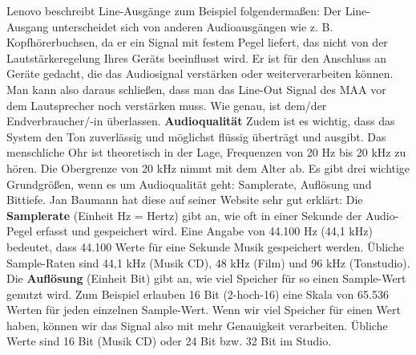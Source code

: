 \documentclass[11pt, twoside]{article}
\begin{document}
Lenovo beschreibt Line-Ausgänge zum Beispiel folgendermaßen: \glqq Der Line-Ausgang unterscheidet sich von anderen Audioausgängen wie z. B. Kopfhörerbuchsen, da er ein Signal mit festem Pegel liefert, das nicht von der Lautstärkeregelung Ihres Geräts beeinflusst wird. Er ist für den Anschluss an Geräte gedacht, die das Audiosignal verstärken oder weiterverarbeiten können.\grqq{} \parencite{noauthor_urlnl02_nodate} \newline
Man kann also daraus schließen, dass man das Line-Out Signal des MAA vor dem Lautsprecher noch verstärken muss. Wie genau, ist dem/der Endverbraucher/-in überlassen.
\vspace{4mm} \newline
\parencite[vgl.][]{noauthor_urlnl02_nodate}
\vspace{4mm}\newline
\textbf{Audioqualität}\newline
Zudem ist es wichtig, dass das System den Ton zuverlässig und möglichst flüssig überträgt und ausgibt.\newline
\glqq Das menschliche Ohr ist theoretisch in der Lage, Frequenzen von 20 Hz bis 20 kHz zu hören. Die
Obergrenze von 20 kHz nimmt mit dem Alter ab.\grqq{} \parencite{noauthor_urlnl03_nodate} \newline
Es gibt drei wichtige Grundgrößen, wenn es um Audioqualität geht: Samplerate, Auflösung und Bittiefe. Jan Baumann hat diese auf seiner Website sehr gut erklärt:
\vspace{4mm}\newline
\glqq Die \textbf{Samplerate} (Einheit Hz = Hertz) gibt an, wie oft in einer Sekunde der Audio-Pegel erfasst und gespeichert wird. Eine Angabe von 44.100 Hz (44,1 kHz) bedeutet, dass 44.100 Werte für eine Sekunde Musik gespeichert werden. Übliche Sample-Raten sind 44,1 kHz (Musik CD), 48 kHz (Film) und 96 kHz (Tonstudio).\grqq{} \parencite{noauthor_urlnl04_nodate}
\vspace{4mm}\newline
\glqq Die \textbf{Auflösung} (Einheit Bit) gibt an, wie viel Speicher für so einen Sample-Wert genutzt wird. Zum Beispiel erlauben 16 Bit (2-hoch-16) eine Skala von 65.536 Werten für jeden einzelnen Sample-Wert. Wenn wir viel Speicher für einen Wert haben, können wir das Signal also mit mehr Genauigkeit verarbeiten. Übliche Werte sind 16 Bit (Musik CD) oder 24 Bit bzw. 32 Bit im Studio.\grqq{} \parencite{noauthor_urlnl04_nodate}
\vspace{4mm}\newline 
\end{document}
